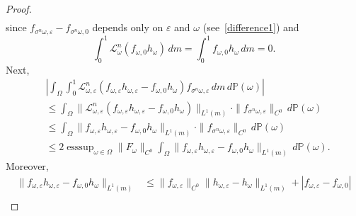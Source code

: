 \documentclass[12pt,reqno,a4paper]{article}
\DeclareMathOperator{\esssup}{esssup}
\begin{document}
\begin{proof}
\[\begin{split}
		\end{split}
		\]
		since $f_{\sigma^n \omega, \varepsilon}-f_{\sigma^n \omega, 0}$ depends only on $\varepsilon$ and $\omega $ (see~\eqref{difference1}) and 
		\[
		\int_0^1 \mathcal L_{\omega}^n (f_{\omega, 0}h_\omega)\, dm=\int_0^1 f_{\omega, 0}h_\omega \, dm=0.
		\]
		Next, 
		\[
		\begin{split}
			& \left |\int_\Omega \int_0^1 \mathcal L_{\omega, \varepsilon}^n(f_{\omega, \varepsilon}h_{\omega, \varepsilon}-f_{\omega, 0}h_\omega) f_{\sigma^n \omega, \varepsilon}\, dm\, d\mathbb P(\omega) \right | \\
			&\le \int_\Omega \|\mathcal L_{\omega, \varepsilon}^n(f_{\omega, \varepsilon}h_{\omega, \varepsilon}-f_{\omega, 0}h_\omega)\|_{L^1(m)}\cdot \|f_{\sigma^n \omega, \varepsilon}\|_{C^0}\, d\mathbb P(\omega) \\
			&\le \int_\Omega \|f_{\omega, \varepsilon}h_{\omega, \varepsilon}-f_{\omega, 0}h_\omega\|_{L^1(m)}\cdot \|f_{\sigma^n \omega, \varepsilon}\|_{C^0}\, d\mathbb P(\omega) \\
			&\le 2\esssup_{\omega \in \Omega}\|F_\omega\|_{C^0}\int_\Omega \|f_{\omega, \varepsilon}h_{\omega, \varepsilon}-f_{\omega, 0}h_\omega\|_{L^1(m)}\, d\mathbb P(\omega) .
		\end{split}
		\]
		Moreover, 
		\[
		\begin{split}
			\|f_{\omega, \varepsilon}h_{\omega, \varepsilon}-f_{\omega, 0}h_\omega\|_{L^1(m)} &\le \|f_{\omega, \varepsilon}\|_{C^0}\|h_{\omega, \varepsilon}-h_\omega\|_{L^1(m)}+|f_{\omega, \varepsilon}-f_{\omega, 0}| \\

\end{split}\]
\end{proof}
\end{document}
